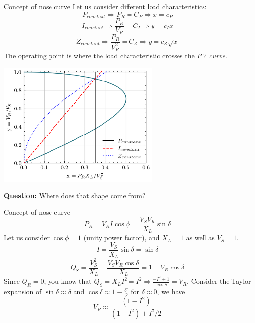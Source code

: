 \begin{frame}{Concept of nose curve}
Let us consider different load characteristics:
$$P_{constant} \Rightarrow P_R = C_P \Rightarrow x = c_P$$
$$I_{constant} \Rightarrow \frac{P_R}{V_R} = C_I \Rightarrow y = c_I x$$
$$Z_{constant} \Rightarrow \frac{P_R}{V^2_R} = C_Z \Rightarrow y = c_Z \sqrt{x}$$
The operating point is where the load characteristic crosses the \emph{PV curve}.
\begin{center}
\includegraphics[width=0.6\textwidth]{images/NoseCurve.png}
\end{center}
\textbf{Question:} Where does that shape come from?
\end{frame}

\begin{frame}{Concept of nose curve}
$$P_R = V_R I \cos{\phi} = \frac{V_SV_R}{X_L}\sin \delta$$
Let us consider $\cos{\phi} = 1$ (unity power factor), and $X_L=1$ as well as $V_S=1$.
$$I = \frac{V_S}{X_L}\sin \delta = \sin \delta$$
$$Q_S = \frac{V_S^2}{X_L} - \frac{V_S V_R \cos \delta}{X_L} = 1-V_R \cos \delta$$
Since $Q_R = 0$, you know that $Q_S = X_L I^2 = I^2 \Rightarrow \frac{-I^2+1}{\cos \delta} = V_R$.
Consider the Taylor expansion of $\sin \delta \approx \delta$ and $\cos \delta \approx 1-\frac{\delta^2}{2}$ for $\delta \approx 0$, we have
$$V_R \approx \frac{(1-I^2)}{(1-I^2)+I^2/2}$$
\end{frame}

